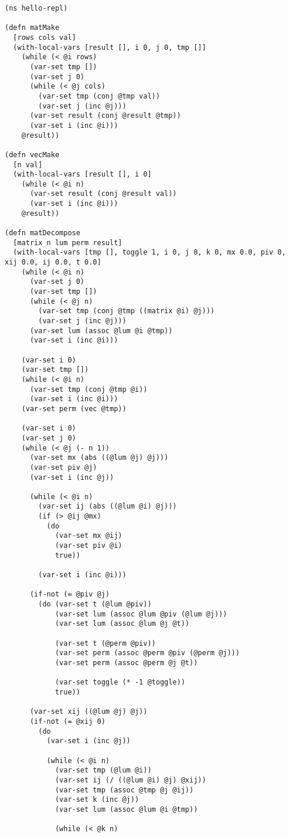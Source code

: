 \begin{center}
	\captionsetup{justification=raggedright,singlelinecheck=off}
	\begin{lstlisting}[label=lst:clojurehelloworld-4,caption=Нахождение обратной матрицы]
(ns hello-repl)

(defn matMake
  [rows cols val]
  (with-local-vars [result [], i 0, j 0, tmp []]
	(while (< @i rows)
	  (var-set tmp [])
	  (var-set j 0)
	  (while (< @j cols)
		(var-set tmp (conj @tmp val))
		(var-set j (inc @j)))
	  (var-set result (conj @result @tmp))
	  (var-set i (inc @i)))
	@result))

(defn vecMake
  [n val]
  (with-local-vars [result [], i 0]
	(while (< @i n)
	  (var-set result (conj @result val))
	  (var-set i (inc @i)))
	@result))

(defn matDecompose
  [matrix n lum perm result]
  (with-local-vars [tmp [], toggle 1, i 0, j 0, k 0, mx 0.0, piv 0, xij 0.0, ij 0.0, t 0.0]
	(while (< @i n)
	  (var-set j 0)
	  (var-set tmp [])
	  (while (< @j n)
		(var-set tmp (conj @tmp ((matrix @i) @j)))
		(var-set j (inc @j)))
	  (var-set lum (assoc @lum @i @tmp))
	  (var-set i (inc @i)))

	(var-set i 0)
	(var-set tmp [])
	(while (< @i n)
	  (var-set tmp (conj @tmp @i))
	  (var-set i (inc @i)))
	(var-set perm (vec @tmp))

	(var-set i 0)
	(var-set j 0)
	(while (< @j (- n 1))
	  (var-set mx (abs ((@lum @j) @j)))
	  (var-set piv @j)
	  (var-set i (inc @j))

	  (while (< @i n)
		(var-set ij (abs ((@lum @i) @j)))
		(if (> @ij @mx)
		  (do
			(var-set mx @ij)
			(var-set piv @i)
			true))

		(var-set i (inc @i)))

	  (if-not (= @piv @j)
		(do (var-set t (@lum @piv))
			(var-set lum (assoc @lum @piv (@lum @j)))
			(var-set lum (assoc @lum @j @t))

			(var-set t (@perm @piv))
			(var-set perm (assoc @perm @piv (@perm @j)))
			(var-set perm (assoc @perm @j @t))

			(var-set toggle (* -1 @toggle))
			true))

	  (var-set xij ((@lum @j) @j))
	  (if-not (= @xij 0)
		(do
		  (var-set i (inc @j))

		  (while (< @i n)
			(var-set tmp (@lum @i))
			(var-set ij (/ ((@lum @i) @j) @xij))
			(var-set tmp (assoc @tmp @j @ij))
			(var-set k (inc @j))
			(var-set lum (assoc @lum @i @tmp))

			(while (< @k n)


\end{lstlisting}
\end{center}
